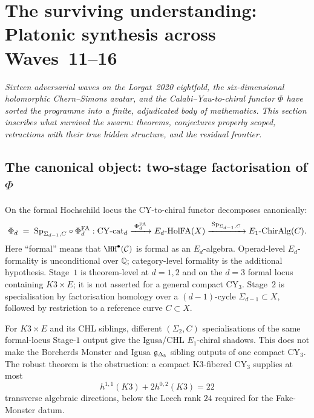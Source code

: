 \section{The surviving understanding: Platonic synthesis across
Waves~11--16}
\label{wn:sec:platonic-synthesis-11-16}

\emph{Sixteen adversarial waves on the Lorgat~2020 eightfold, the six-dimensional
holomorphic Chern--Simons avatar, and the Calabi--Yau-to-chiral functor $\Phi$
have sorted the programme into a finite, adjudicated body of mathematics.
This section inscribes what survived the swarm: theorems, conjectures
properly scoped, retractions with their true hidden structure, and the
residual frontier.}

\subsection{The canonical object: two-stage factorisation of $\Phi$}
\label{wn:subsec:plat-two-stage}

\begin{theorem}\ClaimStatusCorrected
\label{wn:thm:plat-two-stage}
On the formal Hochschild locus the CY-to-chiral functor decomposes
canonically:
\[
\Phi_d \;=\; \mathrm{Sp}_{\Sigma_{d-1},C} \circ \Phi^{\mathrm{FA}}_d : \mathrm{CY}\text{-cat}_d
\xrightarrow{\;\Phi^{\mathrm{FA}}_d\;} E_d\text{-}\mathrm{HolFA}(X)
\xrightarrow{\;\mathrm{Sp}_{\Sigma_{d-1},C}\;} E_1\text{-}\mathrm{ChirAlg}(C).
\]
Here ``formal'' means that $\HH^\bullet(\mathcal C)$ is formal as an
$E_d$-algebra.  Operad-level $E_d$-formality is unconditional over
$\mathbb Q$; category-level formality is the additional hypothesis.
Stage~$1$ is theorem-level at $d=1,2$ and on the $d=3$ formal locus
containing $K3\times E$; it is not asserted for a general compact CY$_3$.
Stage~$2$ is specialisation by factorisation homology over a
$(d{-}1)$-cycle $\Sigma_{d-1}\subset X$, followed by restriction to a
reference curve $C\subset X$.
\end{theorem}

\begin{corollary}\ClaimStatusCorrected
\label{wn:cor:plat-many-bkms}
For $K3\times E$ and its CHL siblings, different $(\Sigma_2,C)$
specialisations of the same formal-locus Stage-$1$ output give the
Igusa/CHL $E_1$-chiral shadows.  This does not make the Borcherds Monster
and Igusa $\mathfrak{g}_{\Delta_5}$ sibling outputs of one compact CY$_3$.  The
robust theorem is the obstruction: a compact K3-fibered CY$_3$ supplies
at most
\[
h^{1,1}(K3)+2h^{0,2}(K3)=22
\]
transverse algebraic directions, below the Leech rank $24$ required for
the Fake-Monster datum.
\end{corollary}

